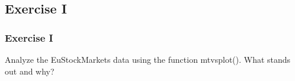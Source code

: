 


\subsection{Exercise I}
\begin{frame}
	\frametitle{Exercise I}
	Analyze the \ttfamily EuStockMarkets \normalfont data using the function \ttfamily mtvsplot()\normalfont.  What stands out and why?
\end{frame}